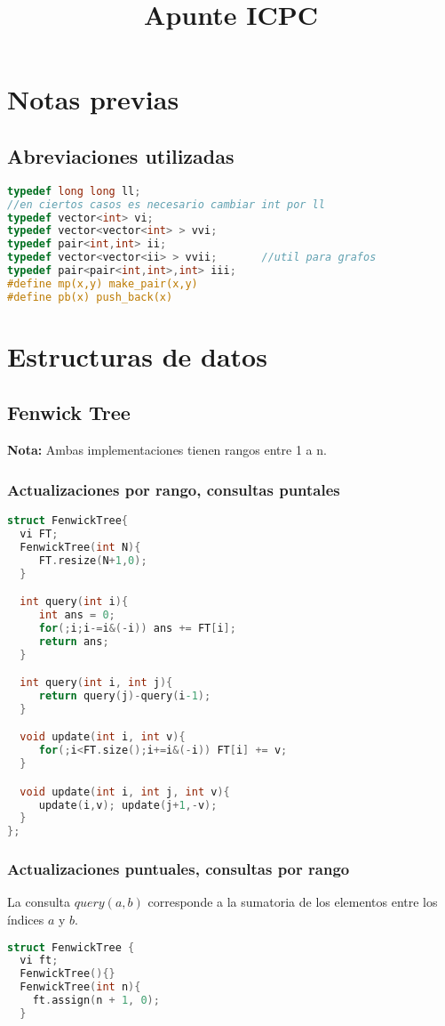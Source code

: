 \documentclass{book}
\title{Apunte ICPC}
\begin{document}
{\let\cleardoublepage\clearpage 
	\maketitle	
	\tableofcontents

	\frontmatter
	\chapter{Notas previas}
	\section{Abreviaciones utilizadas}
\begin{lstlisting}[language=C]
typedef long long ll;
//en ciertos casos es necesario cambiar int por ll
typedef vector<int> vi;
typedef vector<vector<int> > vvi;
typedef pair<int,int> ii;
typedef vector<vector<ii> > vvii;		//util para grafos
typedef pair<pair<int,int>,int> iii;
#define mp(x,y) make_pair(x,y)
#define pb(x) push_back(x)
\end{lstlisting}

	\mainmatter
	\chapter{Estructuras de datos}
	\section{Fenwick Tree}
	\textbf{Nota:} Ambas implementaciones tienen rangos entre 1 a n.
	\subsection{Actualizaciones por rango, consultas puntales }
	\begin{lstlisting}[language=C]
struct FenwickTree{
  vi FT;
  FenwickTree(int N){
     FT.resize(N+1,0);
  }

  int query(int i){
     int ans = 0;
     for(;i;i-=i&(-i)) ans += FT[i];
     return ans;
  }

  int query(int i, int j){
     return query(j)-query(i-1);
  }

  void update(int i, int v){
     for(;i<FT.size();i+=i&(-i)) FT[i] += v;
  }

  void update(int i, int j, int v){
     update(i,v); update(j+1,-v);
  }
};

	\end{lstlisting}
	\pagebreak
	\subsection{Actualizaciones puntuales, consultas por rango}
	La consulta $query(a,b)$ corresponde a la sumatoria de los elementos entre los \'indices $a$ y $b$.
	\begin{lstlisting}[language=C]
struct FenwickTree {
  vi ft;
  FenwickTree(){}  
  FenwickTree(int n){
    ft.assign(n + 1, 0);
  }


\end{lstlisting}}
\end{document}
